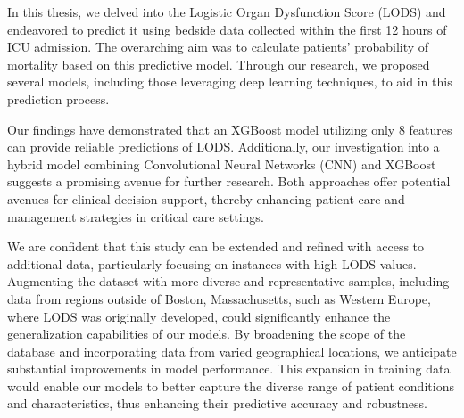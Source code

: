 \documentclass[12pt,a4paper,english
]{tunithesis}
\begin{document}
In this thesis, we delved into the Logistic Organ Dysfunction Score (LODS) and endeavored to predict it using bedside data collected within the first 12 hours of ICU admission. The overarching aim was to calculate patients' probability of mortality based on this predictive model. Through our research, we proposed several models, including those leveraging deep learning techniques, to aid in this prediction process.

Our findings have demonstrated that an XGBoost model utilizing only 8 features can provide reliable predictions of LODS. Additionally, our investigation into a hybrid model combining Convolutional Neural Networks (CNN) and XGBoost suggests a promising avenue for further research. Both approaches offer potential avenues for clinical decision support, thereby enhancing patient care and management strategies in critical care settings.

We are confident that this study can be extended and refined with access to additional data, particularly focusing on instances with high LODS values. Augmenting the dataset with more diverse and representative samples, including data from regions outside of Boston, Massachusetts, such as Western Europe, where LODS was originally developed, could significantly enhance the generalization capabilities of our models. By broadening the scope of the database and incorporating data from varied geographical locations, we anticipate substantial improvements in model performance. This expansion in training data would enable our models to better capture the diverse range of patient conditions and characteristics, thus enhancing their predictive accuracy and robustness.

 




\newpage

\printbibliography[title=References]
\end{document}
